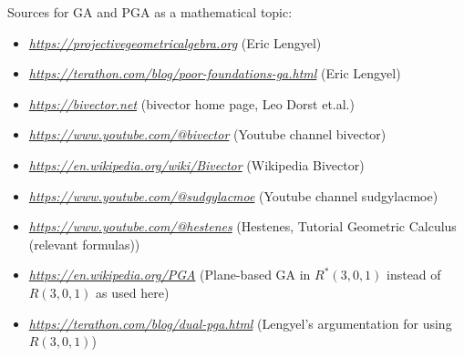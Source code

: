 Sources for GA and PGA as a mathematical topic:
\begin{itemize}
    \scriptsize
    \item
    \href{https://projectivegeometricalgebra.org}{\textit{https://projectivegeometricalgebra.org}}
    (Eric Lengyel)
    \item
    \href{https://terathon.com/blog/poor-foundations-ga.html}{\textit{https://terathon.com/blog/poor-foundations-ga.html}}
    (Eric Lengyel)
    \item
    \href{https://bivector.net}{\textit{https://bivector.net}}
    (bivector home page, Leo Dorst et.al.)
    \item
    \href{https://www.youtube.com/@bivector}{\textit{https://www.youtube.com/@bivector}}
    (Youtube channel bivector)
    \item
    \href{https://en.wikipedia.org/wiki/Bivector}{\textit{https://en.wikipedia.org/wiki/Bivector}}
    (Wikipedia Bivector)
    \item
    \href{https://www.youtube.com/@sudgylacmoe}{\textit{https://www.youtube.com/@sudgylacmoe}}
    (Youtube channel sudgylacmoe)
    \item
    \href{https://www.youtube.com/watch?v=ItGlUbFBFfc}{\textit{https://www.youtube.com/@hestenes}}
    (Hestenes, Tutorial Geometric Calculus (relevant formulas))
    \item
    \href{https://en.wikipedia.org/wiki/Plane-based_geometric_algebra}{\textit{https://en.wikipedia.org/PGA}}
    (Plane-based GA in $R^*(3,0,1)$ instead of $R(3,0,1)$ as used here)
    \item
    \href{https://terathon.com/blog/dual-pga.html}{\textit{https://terathon.com/blog/dual-pga.html}}
    (Lengyel's argumentation for using $R(3,0,1)$)
\end{itemize}

